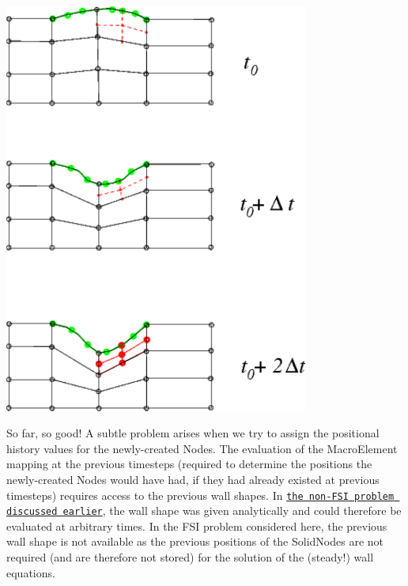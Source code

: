  
\begin{DoxyImage}
\includegraphics[width=0.75\textwidth]{history_values}
\end{DoxyImage}


So far, so good! A subtle problem arises when we try to assign the positional history values for the newly-\/created {\ttfamily Nodes}. The evaluation of the {\ttfamily Macro\+Element} mapping at the previous timesteps (required to determine the positions the newly-\/created {\ttfamily Nodes} would have had, if they had already existed at previous timesteps) requires access to the previous wall shapes. In \href{../../../navier_stokes/collapsible_channel/html/index.html}{\tt the non-\/\+F\+SI problem discussed earlier}, the wall shape was given analytically and could therefore be evaluated at arbitrary times. In the F\+SI problem considered here, the previous wall shape is not available as the previous positions of the {\ttfamily Solid\+Nodes} are not required (and are therefore not stored) for the solution of the (steady!) wall equations.



